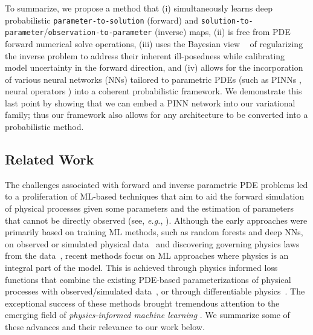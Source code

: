 \documentclass[11pt, fleqn]{article}
\begin{document}
To summarize, we propose a method that (i) simultaneously learns deep probabilistic \texttt{parameter-to-solution} (forward) and \texttt{solution-to-parameter}/\texttt{observation-to-parameter} (inverse) maps, (ii) is free from PDE forward numerical solve operations, (iii) uses the Bayesian view ~\cite{stuart_2010} of regularizing the inverse problem to address their inherent ill-posedness while calibrating model uncertainty in the forward direction, and (iv) allows for the incorporation of various neural networks (NNs) tailored to parametric PDEs (such as \gls*{PINN}s \cite{raissi2019physics}, neural operators \cite{li2020fourier, lu2021learning, anandkumar2020neural, kovachki2023neural}) into a coherent probabilistic framework. We demonstrate this last point by showing that we can embed a \gls*{PINN} network into our variational family; thus our framework also allows for any architecture to be converted into a probabilistic method. 

\subsection{Related Work}
%
The challenges associated with forward and inverse parametric PDE problems led to a proliferation of ML-based techniques that aim to aid the forward simulation of physical processes given some parameters and the estimation of parameters that cannot be directly observed (see, \emph{e.g.}, \cite{Han2017solving, Sirignano2018DGM, karniadakis2021physics}). Although the early approaches were primarily based on training ML methods, such as random forests and deep NNs, on observed or simulated physical data~\cite{Raveendran2014Blending} and discovering governing physics laws from the data~\cite{brunton2016discovering}, recent methods focus on ML approaches where physics is an integral part of the model. This is achieved through physics informed loss functions that combine the existing PDE-based parameterizations of physical processes with observed/simulated data~\cite{kim2019deep}, or through differentiable physics~\cite{raissi2019physics, ardizzone2018analyzing, zhao2022learning}. The exceptional success of these methods brought tremendous attention to the emerging field of \textit{physics-informed machine learning} \cite{karniadakis2021physics, ghattas2021learning}. We summarize some of these advances and their relevance to our work below. \\
\end{document}
